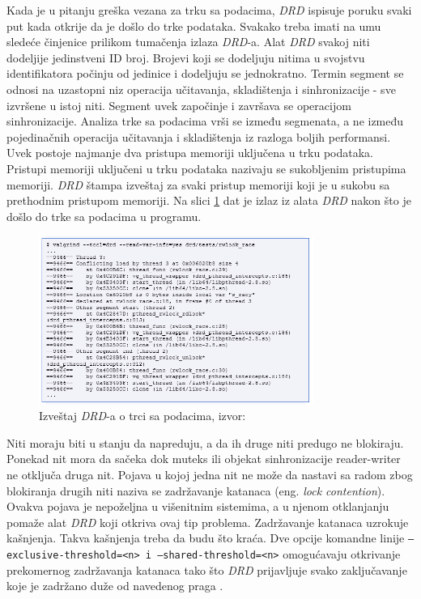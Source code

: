 \documentclass[12pt,oneside]{memoir}
\theoremstyle{plain}
\theoremstyle{definition}
\begin{document}
Kada je u pitanju greška vezana za trku sa podacima, \textit{DRD} ispisuje poruku svaki put kada otkrije da je došlo do trke podataka. Svakako treba imati na umu sledeće činjenice prilikom tumačenja izlaza \textit{DRD}-a. Alat \textit{DRD} svakoj niti dodeljije jedinstveni ID broj. Brojevi koji se dodeljuju nitima u svojstvu identifikatora počinju od jedinice i dodeljuju se jednokratno. Termin segment se odnosi na uzastopni niz  operacija učitavanja, skladištenja i sinhronizacije - sve izvršene u istoj niti. Segment uvek započinje i završava se operacijom sinhronizacije. Analiza trke sa podacima vrši se između segmenata, a ne između pojedinačnih operacija učitavanja i skladištenja iz razloga boljih performansi. Uvek postoje najmanje dva pristupa memoriji uključena u trku podataka. Pristupi memoriji uključeni u trku podataka nazivaju se sukobljenim pristupima memoriji. \textit{DRD} štampa izveštaj za svaki pristup memoriji koji je u sukobu sa prethodnim pristupom memoriji. Na slici \ref{fig:slika2.22} dat je izlaz iz alata \textit{DRD} nakon što je došlo do trke sa podacima u programu. 
\begin{figure}[!ht]
  \centering
  \includegraphics[width=0.8\textwidth]{DRDDataRaceReport.png}
  \caption{Izveštaj \textit{DRD}-a o trci sa podacima, izvor: \cite{Drd}}
  \label{fig:slika2.22}
\end{figure}

Niti moraju biti u stanju da napreduju, a da ih druge niti predugo ne blokiraju. Ponekad nit mora da sačeka dok muteks ili objekat sinhronizacije reader-writer ne otključa druga nit. Pojava u kojoj jedna nit ne može da nastavi sa radom zbog blokiranja drugih niti naziva se zadržavanje katanaca  (eng. \textit{lock contention}). Ovakva pojava je nepoželjna u višenitnim sistemima, a u njenom otklanjanju pomaže alat \textit{DRD} koji otkriva ovaj tip problema. Zadržavanje katanaca uzrokuje kašnjenja. Takva kašnjenja treba da budu što kraća. Dve opcije komandne linije \texttt{--exclusive-threshold=<n> i --shared-threshold=<n>} omogućavaju otkrivanje prekomernog zadržavanja katanaca tako što \textit{DRD} prijavljuje svako zaključavanje koje je zadržano duže od navedenog praga \cite{Drd}. 
\end{document}
